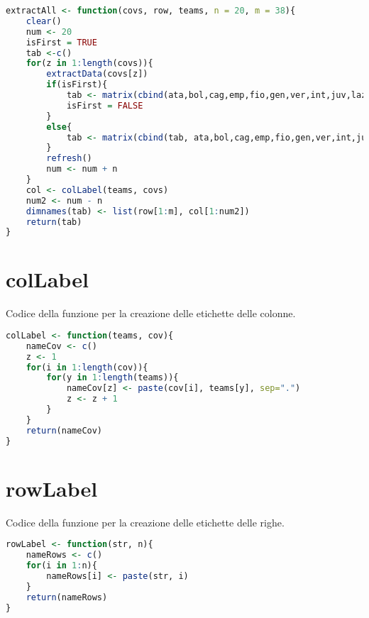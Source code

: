 \begin{lstlisting}[language=R, caption={Codice per estrarre le informazioni di tutte le variabili.}, captionpos=b, label=code:a6]
extractAll <- function(covs, row, teams, n = 20, m = 38){
	clear()
	num <- 20
	isFirst = TRUE
	tab <-c()
	for(z in 1:length(covs)){
		extractData(covs[z])
		if(isFirst){
			tab <- matrix(cbind(ata,bol,cag,emp,fio,gen,ver,int,juv,laz,mil,nap,rom,sal,sam,sas,spe,tor,udi,ven), nrow = m, ncol = num)
			isFirst = FALSE
		}
		else{
			tab <- matrix(cbind(tab, ata,bol,cag,emp,fio,gen,ver,int,juv,laz,mil,nap,rom,sal,sam,sas,spe,tor,udi,ven), nrow = m, ncol = num)
		}
		refresh()
		num <- num + n 		
	}
	col <- colLabel(teams, covs)  
	num2 <- num - n
	dimnames(tab) <- list(row[1:m], col[1:num2])
	return(tab)
}
\end{lstlisting}

\section{colLabel}
\label{sez:Z1.3}
Codice della funzione per la creazione delle etichette delle colonne.

\begin{lstlisting}[language=R, caption={Codice per la creazione delle etichette delle colonne.}, captionpos=b, label=code:a7]
colLabel <- function(teams, cov){
	nameCov <- c()
	z <- 1
	for(i in 1:length(cov)){
		for(y in 1:length(teams)){
			nameCov[z] <- paste(cov[i], teams[y], sep=".")
			z <- z + 1
		}
	}
	return(nameCov)
}

\end{lstlisting}

\section{rowLabel}
\label{sez:Z1.4}
Codice della funzione per la creazione delle etichette delle righe.

\begin{lstlisting}[language=R, caption={Codice per la creazione delle etichette delle righe.}, captionpos=b, label=code:a8]
rowLabel <- function(str, n){
	nameRows <- c()
	for(i in 1:n){
		nameRows[i] <- paste(str, i)
	}
	return(nameRows)
}

\end{lstlisting}
